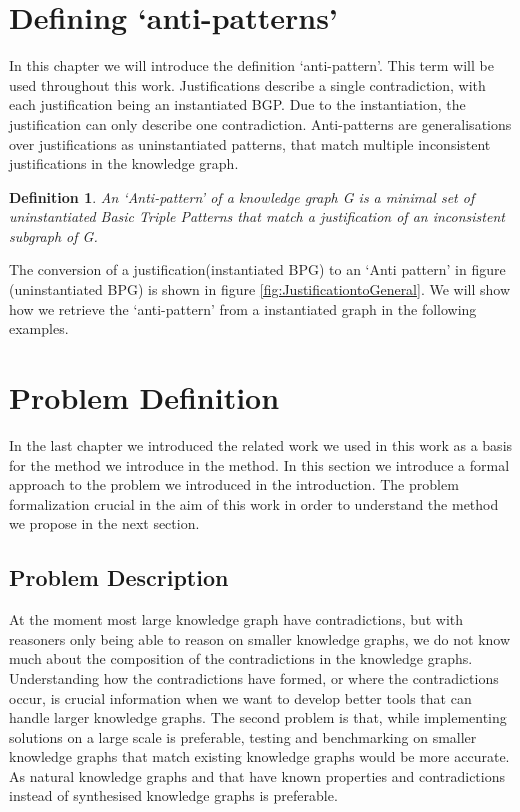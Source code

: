 \documentclass{article}
\newtheorem{definition}{Definition}
\begin{document}
\newpage
\section[AntiPatternDefinition]{Defining `anti-patterns'}
In this chapter we will introduce the definition `anti-pattern'. This term will be used throughout this work. Justifications describe a single contradiction, with each justification being an instantiated BGP. Due to the instantiation, the justification can only describe one contradiction. Anti-patterns are generalisations over justifications as uninstantiated patterns, that match  multiple inconsistent justifications in the knowledge graph. 

\begin{definition} 
	An \textit{`Anti-pattern'} \textit{of a knowledge graph G is a minimal set of uninstantiated Basic Triple Patterns that match a justification of an inconsistent subgraph of G.}
\end{definition}

The conversion of a justification(instantiated BPG) to an `Anti pattern' in figure (uninstantiated BPG) is shown in figure  \ref{fig:JustificationtoGeneral}.
We will show how we retrieve the `anti-pattern' from a instantiated graph in the following examples.

\newpage
\section{Problem Definition}
In the last chapter we introduced the related work we used in this work as a basis for the method we introduce in the method. In this section we introduce a formal approach to the problem we introduced in the introduction. The problem formalization crucial in the aim of this work in order to understand the method we propose in the next section.

\subsection{Problem Description}
At the moment most large knowledge graph have contradictions, but with reasoners only being able to reason on smaller knowledge graphs, we do not know much about the composition of the contradictions in the knowledge graphs. Understanding how the contradictions have formed, or where the contradictions occur, is crucial information when we want to develop better tools that can handle larger knowledge graphs. The second problem is that, while implementing solutions on a large scale is preferable, testing and benchmarking on smaller knowledge graphs that match existing knowledge graphs would be more accurate. As natural knowledge graphs and that have known properties and contradictions instead of synthesised knowledge graphs is preferable. 
\end{document}
